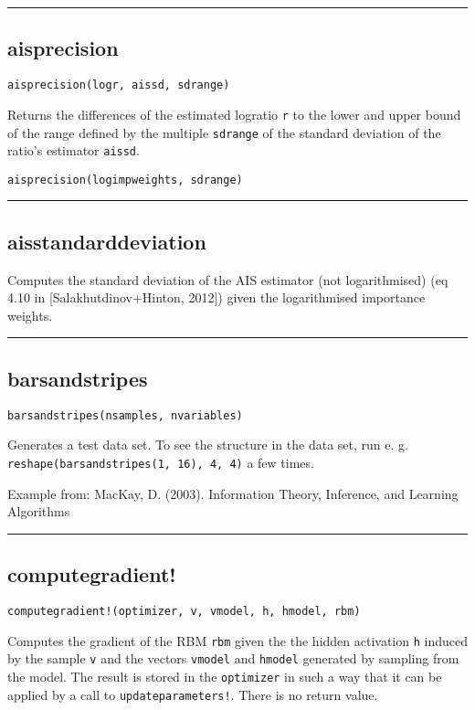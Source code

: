 \noindent\rule{\textwidth}{1pt}
\subsection*{aisprecision}  \label{bms_aisprecision}
\begin{verbatim}
aisprecision(logr, aissd, sdrange)
\end{verbatim}
Returns the differences of the estimated logratio \texttt{r} to the lower and upper bound of the range defined by the multiple \texttt{sdrange} of the standard deviation of the ratio's estimator \texttt{aissd}.

\begin{verbatim}
aisprecision(logimpweights, sdrange)
\end{verbatim}
\noindent\rule{\textwidth}{1pt}
\subsection*{aisstandarddeviation}  \label{bms_aisstandarddeviation}
Computes the standard deviation of the AIS estimator (not logarithmised) (eq 4.10 in [Salakhutdinov+Hinton, 2012]) given the logarithmised importance weights.

\noindent\rule{\textwidth}{1pt}
\subsection*{barsandstripes}  \label{bms_barsandstripes}
\begin{verbatim}
barsandstripes(nsamples, nvariables)
\end{verbatim}
Generates a test data set. To see the structure in the data set, run e. g. \texttt{reshape(barsandstripes(1, 16), 4, 4)} a few times.

Example from: MacKay, D. (2003). Information Theory, Inference, and Learning Algorithms

\noindent\rule{\textwidth}{1pt}
\subsection*{computegradient!}  \label{bms_computegradient!}
\begin{verbatim}
computegradient!(optimizer, v, vmodel, h, hmodel, rbm)
\end{verbatim}
Computes the gradient of the RBM \texttt{rbm} given the the hidden activation \texttt{h} induced by the sample \texttt{v} and the vectors \texttt{vmodel} and \texttt{hmodel} generated by sampling from the model. The result is stored in the \texttt{optimizer} in such a way that it can be applied by a call to \texttt{updateparameters!}. There is no return value.

